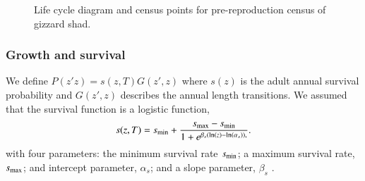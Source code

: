 \documentclass[preprint,review,12pt,authoryear]{elsarticle}
\begin{document}
\begin{figure}
\begin{center}
\end{center}
 \caption{\small{Life cycle diagram and census points for pre-reproduction census of gizzard shad.}}
\end{figure}

\subsubsection{Growth and survival}
We define $P(z'z) = s(z,T)G(z',z)$ where $s(z)$ is the adult annual survival probability and $G(z',z)$ describes the annual length transitions. 
We assumed that the survival function is a logistic function,
\begin{equation}\label{eq:surv}
s(z,T) = s_{\rm min} + \frac{s_{\rm max}-s_{\rm min}}{1+e^{\beta_s(\ln(z)-\ln(\alpha_s)),}}.
\end{equation}
with four parameters: the minimum survival rate $s_{\rm min}$; a maximum survival rate, $s_{\rm max}$; and intercept parameter, $\alpha_{s}$; and a slope parameter, $\beta_{s}$ \citep{bolker2008ecological}.  
\end{document}
